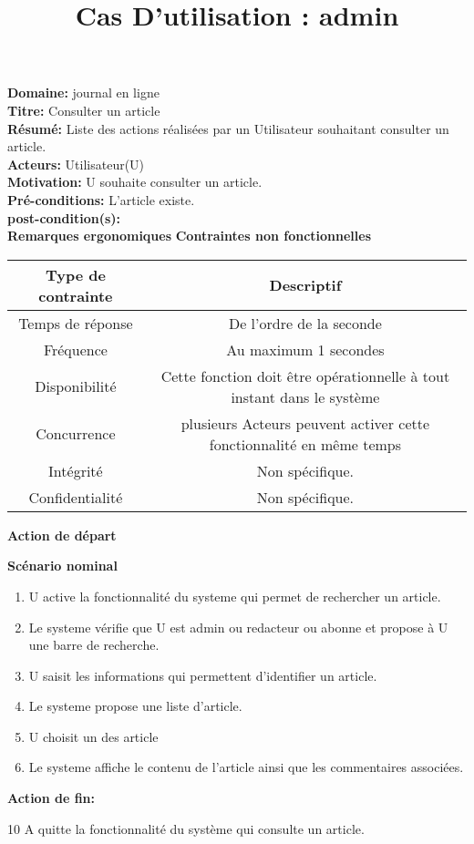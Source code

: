 \documentclass[a4paper,10pt]{article}
\title{Cas D'utilisation : admin}
\author{}
\begin{document}
\maketitle



\textbf{Domaine:} journal en ligne\\
\textbf{Titre:} Consulter un article\\
\textbf{Résumé:} Liste des actions réalisées par un Utilisateur souhaitant consulter un article.\\
\textbf{Acteurs:} Utilisateur(U)\\
\textbf{Motivation:} U souhaite consulter un article.\\
\textbf{Pré-conditions:} L'article existe.\\
\textbf{post-condition(s):}\\

\textbf{Remarques ergonomiques}
\textbf{Contraintes non fonctionnelles}
\begin{center}
  \begin{tabular}{|c|c|}
\hline
   \textbf{Type de contrainte}&\textbf{Descriptif}\\
\hline
Temps de réponse&De l'ordre de la seconde\\
\hline
Fréquence & Au maximum 1 secondes\\
\hline
Disponibilité & Cette fonction doit être opérationnelle à tout instant dans le système\\
\hline
Concurrence&plusieurs Acteurs peuvent activer cette fonctionnalité en même temps\\
\hline
Intégrité&Non spécifique.\\
\hline
Confidentialité& Non spécifique.\\
\hline

  \end{tabular}
\end{center}

\textbf{Action de départ}

\textbf{Scénario nominal}
\begin{enumerate}
\item U active la fonctionnalité du systeme qui permet de rechercher un article.
\item Le systeme vérifie que U est admin ou redacteur ou abonne et propose à U une barre de recherche.
\item U saisit les informations qui permettent d'identifier un article.
\item Le systeme propose une liste d'article.
\item U choisit un des article
\item Le systeme affiche le contenu de l'article ainsi que les commentaires associées.
\end{enumerate}

\textbf{Action de fin:}

10 A quitte la fonctionnalité du système qui consulte un article.
\end{document}
